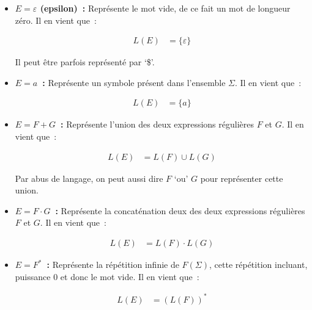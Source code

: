 \begin{itemize}
    \item[\textbullet] \textbf{\(E = \varepsilon\) (epsilon)~:}
        Représente le mot vide, de ce fait un mot de longueur zéro. Il en vient
        que~:

        \begin{align}
            L(E) & = \{\varepsilon\}
        \end{align}

        Il peut être parfois représenté par `\$'.

        \vphantom{}

    \item[\textbullet] \textbf{\(E = a\)~:} Représente un symbole
        présent dans l'ensemble \(\Sigma\). Il en vient que~:

        \begin{align}
            L(E) & = \{a\}
        \end{align}

        \vphantom{}

    \item[\textbullet] \textbf{\(E = F + G\)~:} Représente l'union
        des deux expressions régulières \(F\) et \(G\). Il en
        vient que~:

        \begin{align}
            L(E) & = L(F) \cup L(G)
        \end{align}

        Par abus de langage, on peut aussi dire \(F\) `ou' \(G\) pour représenter cette
        union.

        \vphantom{}

    \item[\textbullet] \textbf{\(E = F \cdot G\)~:}
        Représente la concaténation deux des deux expressions régulières
        \(F\) et \(G\). Il en vient que~:

        \begin{align}
            L(E) & = L(F) \cdot L(G)
        \end{align}

        \vphantom{}

    \item[\textbullet] \textbf{\(E = F^* \)~:} Représente la
        répétition infinie de \(F(\Sigma)\), cette répétition incluant,
        puissance \(0\) et donc le mot vide. Il en vient que~:

        \begin{align}
            L(E) & = (L(F))^*
        \end{align}
\end{itemize}


